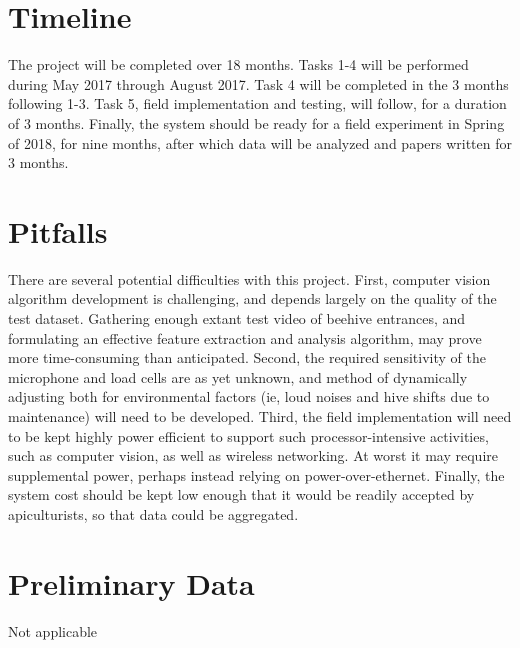 \section{Timeline}

The project will be completed over 18 months. Tasks 1-4 will be performed during May 2017 through August 2017. Task 4 will be completed in the 3 months following 1-3. Task 5, field implementation and testing, will follow, for a duration of 3 months. Finally, the system should be ready for a field experiment in Spring of 2018, for nine months, after which data will be analyzed and papers written for 3 months.
\section{Pitfalls}

There are several potential difficulties with this project. First, computer vision algorithm development is challenging, and depends largely on the quality of the test dataset. Gathering enough extant test video of beehive entrances, and formulating an effective feature extraction and analysis algorithm, may prove more time-consuming than anticipated. Second, the required sensitivity of the microphone and load cells are as yet unknown, and method of dynamically adjusting both for environmental factors (ie, loud noises and hive shifts due to maintenance) will need to be developed. Third, the field implementation will need to be kept highly power efficient to support such processor-intensive activities, such as computer vision, as well as wireless networking. At worst it may require  supplemental power, perhaps instead relying on power-over-ethernet. Finally, the system cost should be kept low enough that it would be readily accepted by apiculturists, so that data could be aggregated.

\section{Preliminary Data}

Not applicable
